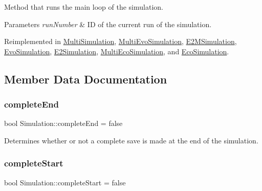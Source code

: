 Method that runs the main loop of the simulation. 


\begin{DoxyParams}{Parameters}
{\em run\+Number} & ID of the current run of the simulation. \\
\hline
\end{DoxyParams}


Reimplemented in \hyperlink{classMultiSimulation_a235347d04fd0c7e1a2e35d7a39e77583}{Multi\+Simulation}, \hyperlink{classMultiEvoSimulation_a89c9806ac998c06230cdd41cc6a532bf}{Multi\+Evo\+Simulation}, \hyperlink{classE2MSimulation_aeac4e92c10f89a5c953ace5b1327d20b}{E2\+M\+Simulation}, \hyperlink{classEvoSimulation_aa43aa351dec24c638e56995a67a4f0f5}{Evo\+Simulation}, \hyperlink{classE2Simulation_a28028881fd443d2445b562512cb2169c}{E2\+Simulation}, \hyperlink{classMultiEcoSimulation_ad490e089c083d06d80c62af9e1564ac3}{Multi\+Eco\+Simulation}, and \hyperlink{classEcoSimulation_a72ec5e7dffb4231b2cb363b632788622}{Eco\+Simulation}.



\subsection{Member Data Documentation}
\hypertarget{classSimulation_a17bcf189d0f10fa47e4b2dc4b53d4939}{}\label{classSimulation_a17bcf189d0f10fa47e4b2dc4b53d4939} 
\subsubsection{\texorpdfstring{complete\+End}{completeEnd}}
{\footnotesize\ttfamily bool Simulation\+::complete\+End = false\hspace{0.3cm}{\ttfamily [protected]}}

Determines whether or not a complete save is made at the end of the simulation. \hypertarget{classSimulation_a84cd73f44cff4fdbbb40fb98b49f8026}{}\label{classSimulation_a84cd73f44cff4fdbbb40fb98b49f8026} 
\subsubsection{\texorpdfstring{complete\+Start}{completeStart}}
{\footnotesize\ttfamily bool Simulation\+::complete\+Start = false\hspace{0.3cm}{\ttfamily [protected]}}

